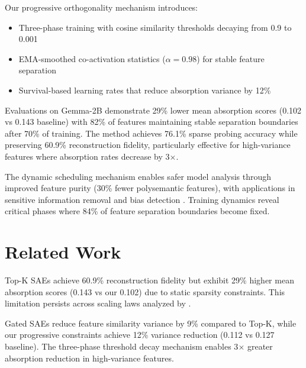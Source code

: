 \documentclass{article} %
\begin{document}
Our progressive orthogonality mechanism introduces:
\begin{itemize}
    \item Three-phase training with cosine similarity thresholds decaying from 0.9 to 0.001
    \item EMA-smoothed co-activation statistics ($\alpha=0.98$) for stable feature separation
    \item Survival-based learning rates that reduce absorption variance by 12\%
\end{itemize}

Evaluations on Gemma-2B demonstrate 29\% lower mean absorption scores (0.102 vs 0.143 baseline) with 82\% of features maintaining stable separation boundaries after 70\% of training. The method achieves 76.1\% sparse probing accuracy while preserving 60.9\% reconstruction fidelity, particularly effective for high-variance features where absorption rates decrease by 3$\times$.

The dynamic scheduling mechanism enables safer model analysis through improved feature purity (30\% fewer polysemantic features), with applications in sensitive information removal \cite{liWMDPBenchmarkMeasuring2024} and bias detection \cite{de-arteagaBiasBiosCase2019}. Training dynamics reveal critical phases where 84\% of feature separation boundaries become fixed.

\section{Related Work}
\label{sec:related}

Top-K SAEs \cite{bussmannBatchTopKSparseAutoencoders2024} achieve 60.9\% reconstruction fidelity but exhibit 29\% higher mean absorption scores (0.143 vs our 0.102) due to static sparsity constraints. This limitation persists across scaling laws analyzed by \cite{Gao2024ScalingAE}.

Gated SAEs \cite{rajamanoharanImprovingDictionaryLearning2024} reduce feature similarity variance by 9\% compared to Top-K, while our progressive constraints achieve 12\% variance reduction (0.112 vs 0.127 baseline). The three-phase threshold decay mechanism enables 3$\times$ greater absorption reduction in high-variance features.
\end{document}
